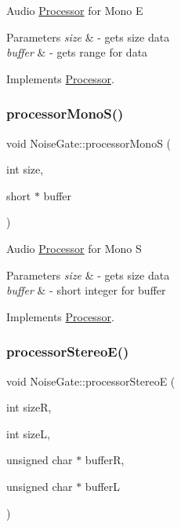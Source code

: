 Audio \hyperlink{classProcessor}{Processor} for Mono E 
\begin{DoxyParams}{Parameters}
{\em size} & -\/ gets size data \\
\hline
{\em buffer} & -\/ gets range for data \\
\hline
\end{DoxyParams}


Implements \hyperlink{classProcessor_aa9742b5df48a3c6442d521ce93012fc1}{Processor}.

\mbox{\label{classNoiseGate_a46b2ad11fa1dac657450c2299026bee4}} 
\subsubsection{\texorpdfstring{processor\+Mono\+S()}{processorMonoS()}}
{\footnotesize\ttfamily void Noise\+Gate\+::processor\+MonoS (\begin{DoxyParamCaption}\item[{int}]{size,  }\item[{short $\ast$}]{buffer }\end{DoxyParamCaption})\hspace{0.3cm}{\ttfamily [virtual]}}

Audio \hyperlink{classProcessor}{Processor} for Mono S 
\begin{DoxyParams}{Parameters}
{\em size} & -\/ gets size data \\
\hline
{\em buffer} & -\/ short integer for buffer \\
\hline
\end{DoxyParams}


Implements \hyperlink{classProcessor_a4cf32c9f7e26383490e8fb49defcc287}{Processor}.

\mbox{\label{classNoiseGate_a3b6bbb8efccac794fe3abf6dbbd92c1f}} 
\subsubsection{\texorpdfstring{processor\+Stereo\+E()}{processorStereoE()}}
{\footnotesize\ttfamily void Noise\+Gate\+::processor\+StereoE (\begin{DoxyParamCaption}\item[{int}]{sizeR,  }\item[{int}]{sizeL,  }\item[{unsigned char $\ast$}]{bufferR,  }\item[{unsigned char $\ast$}]{bufferL }\end{DoxyParamCaption})\hspace{0.3cm}{\ttfamily [virtual]}}

